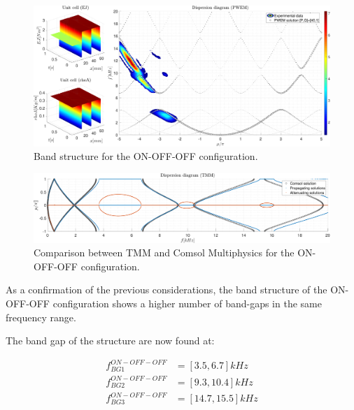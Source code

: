 \begin{figure}[H]
    \centering
    \includegraphics[width=\textwidth]{./img/MATLAB/PWEM_EXP ON-OFF-OFF @0kHz.pdf}
    \caption{Band structure for the ON-OFF-OFF configuration.}
    \label{fig:space_only_on_off_off}
\end{figure}

\begin{figure}[H]
    \centering
    \includegraphics[width=\textwidth]{./img/MATLAB/TMM_COMSOL ON-OFF-OFF @0kHz.pdf}
    \caption{Comparison between TMM and Comsol Multiphysics for the ON-OFF-OFF configuration.}
    \label{fig:space_only_on_off_off_comsol}
\end{figure}

As a confirmation of the previous considerations, the band structure of the ON-OFF-OFF configuration shows a higher number of band-gaps in the same frequency range.

The band gap of the structure are now found at:

\begin{equation}
    \begin{aligned}
        f_{BG1}^{ON-OFF-OFF} & = [3.5, 6.7] kHz   \\
        f_{BG2}^{ON-OFF-OFF} & = [9.3, 10.4] kHz  \\
        f_{BG3}^{ON-OFF-OFF} & = [14.7, 15.5] kHz
    \end{aligned}
\end{equation}
